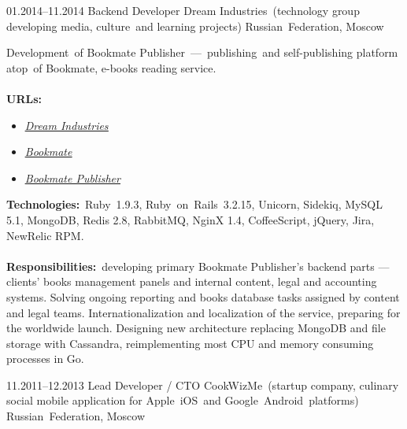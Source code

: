 \documentclass[12pt,a4paper,final]{moderncv}
\begin{document}
\cventry
{01.2014--11.2014}
{Backend Developer}
{Dream Industries~(technology group developing media, culture~and learning projects)}
{Russian~Federation, Moscow}
{}
{
  Development~of Bookmate Publisher~---~publishing~and self-publishing platform atop~of Bookmate, e-books reading service.
  \\\\
  \textbf{URLs:}
  \begin{itemize}
    \item \underline{\href{http://dreamindustries.co/}{\itshape Dream Industries}}
    \item \underline{\href{http://bookmate.com/}{\itshape Bookmate}}
    \item \underline{\href{http://publisher.bookmate.com/}{\itshape Bookmate Publisher}}
  \end{itemize}
  \bigskip
  \textbf{Technologies:}~Ruby~1.9.3, Ruby~on~Rails~3.2.15, Unicorn, Sidekiq, MySQL 5.1, MongoDB, Redis 2.8, RabbitMQ, NginX 1.4, CoffeeScript, jQuery, Jira, NewRelic RPM.
  \\\\
  \textbf{Responsibilities:}~developing primary Bookmate Publisher's backend parts --- clients' books management panels and internal content, legal and accounting systems. Solving ongoing reporting and books database tasks assigned by content and legal teams. Internationalization and localization of the service, preparing for the worldwide launch. Designing new architecture replacing MongoDB and file storage with Cassandra, reimplementing most CPU and memory consuming processes in Go.
}
\cventry
{11.2011--12.2013}
{Lead Developer / CTO}
{CookWizMe~(startup company, culinary social mobile application for Apple~iOS~and Google~Android~platforms)}
{Russian~Federation, Moscow}
{}
\end{document}
